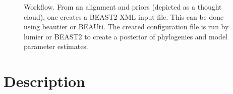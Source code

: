 \documentclass{article}
\begin{document}
\begin{figure}

  \caption{
    Workflow. From an alignment and priors (depicted as a thought cloud), one creates a BEAST2 XML input file. This
    can be done using beautier or BEAUti. The created configuration file is run by lumier or BEAST2
    to create a posterior of phylogenies and model parameter estimates.
  }
  \label{fig:workflow}
\end{figure}

\section{Description}
\end{document}
